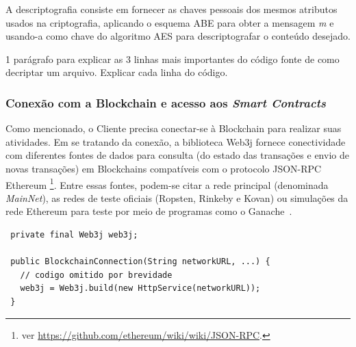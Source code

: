 \documentclass[a4paper,11pt]{article}
\begin{document}
A descriptografia consiste em fornecer as chaves pessoais dos mesmos atributos usados na criptografia, aplicando o esquema ABE para obter a mensagem \emph{m} e usando-a como chave do algoritmo AES para descriptografar o conteúdo desejado.

{\color{Magenta} 1 parágrafo para explicar as 3 linhas mais importantes do código fonte de como decriptar um arquivo. Explicar cada linha do código.}

\subsubsection{Conexão com a Blockchain e acesso aos \textit{Smart Contracts}}






Como mencionado, o Cliente precisa conectar-se à Blockchain para realizar suas atividades.
Em se tratando da conexão, a biblioteca Web3j fornece conectividade com diferentes fontes de dados para consulta (do estado das transações e envio de novas transações) em Blockchains compatíveis com o protocolo JSON-RPC Ethereum
\footnote{ver \href{https://github.com/ethereum/wiki/wiki/JSON-RPC}{https://github.com/ethereum/wiki/wiki/JSON-RPC}.}.
Entre essas fontes, podem-se citar a rede principal (denominada \emph{MainNet}), as redes de teste oficiais (Ropsten, Rinkeby e Kovan) ou simulações da rede Ethereum para teste por meio de programas como o Ganache~\cite{ganache}.


\begin{lstlisting}
 private final Web3j web3j;

 public BlockchainConnection(String networkURL, ...) {
   // codigo omitido por brevidade
   web3j = Web3j.build(new HttpService(networkURL));
 }
\end{lstlisting}
\end{document}
